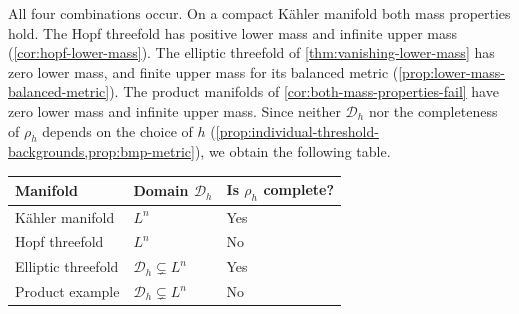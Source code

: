 All four combinations occur. On a compact K\"ahler manifold both mass properties hold. The Hopf threefold has positive lower mass and infinite upper mass (\cref{cor:hopf-lower-mass}). The elliptic threefold of \cref{thm:vanishing-lower-mass} has zero lower mass, and finite upper mass for its balanced metric (\cref{prop:lower-mass-balanced-metric}). The product manifolds of \cref{cor:both-mass-properties-fail} have zero lower mass and infinite upper mass. Since neither $\mathcal D_h$ nor the completeness of $\rho_h$ depends on the choice of $h$ (\cref{prop:individual-threshold-backgrounds,prop:bmp-metric}), we obtain the following table.
\begin{center}
\begin{tabular}{@{}l@{\qquad}l@{\qquad}l@{}}
Manifold & Domain $\mathcal D_h$ & Is $\rho_h$ complete?\\
\hline
K\"ahler manifold & $L^n$ & Yes\\
Hopf threefold & $L^n$ & No\\
Elliptic threefold & $\mathcal D_h\subsetneq L^n$ & Yes\\
Product example & $\mathcal D_h\subsetneq L^n$ & No
\end{tabular}
\end{center}




